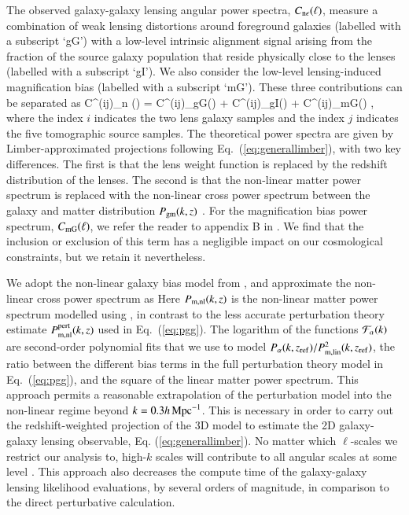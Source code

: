 The observed galaxy-galaxy lensing angular power spectra, $C_{\rm n \epsilon}(\ell)$, measure a combination of weak lensing distortions around foreground galaxies (labelled with a subscript `gG') with a low-level intrinsic alignment signal arising from the fraction of the source galaxy population that reside physically close to the lenses (labelled with a subscript `gI').   We also consider the low-level lensing-induced magnification bias (labelled with a subscript `mG').   These three contributions can be separated as 
\be
\label{eq:cl_ggl}
C^{(ij)}_{\rm n \epsilon}(\ell) = C^{(ij)}_{\rm gG}(\ell) +
C^{(ij)}_{\rm gI}(\ell) + C^{(ij)}_{\rm mG}(\ell)  \;,
\ee
where the index $i$ indicates the two lens galaxy samples and the index $j$ indicates the five tomographic source samples.   The theoretical power spectra are given by Limber-approximated projections following Eq.~(\ref{eq:generallimber}), with two key differences.   The first is that the lens weight function is replaced by the redshift distribution of the lenses.   The second is that the non-linear matter power spectrum is replaced with the non-linear cross power spectrum between the galaxy and matter distribution $P_{\rm gm}(k,z)$ \citep[see equations 28 and 29 of][for the full expressions]{joachimi/etal:inprep}.   For the magnification bias power spectrum, $C_{\rm mG}(\ell)$, we refer the reader to appendix B in \citet{joachimi/etal:inprep}.   We find that the inclusion or exclusion of this term has a negligible impact on our cosmological constraints, but we retain it nevertheless.

We adopt the non-linear galaxy bias model from \citet{sanchez/etal:2017}, and approximate the non-linear cross power spectrum as
Here $P_{\rm m, nl}(k,z)$ is the non-linear matter power spectrum modelled using \citet{mead/etal:2016}, in contrast to the less accurate perturbation theory estimate $P_{\rm m, nl}^{\rm pert}(k,z)$ used in Eq.~(\ref{eq:pgg}). 
The logarithm of the functions ${\cal F}_\alpha(k)$ are second-order polynomial fits that we use to model $P_\alpha(k,z_{\rm ref})/P^2_{\rm m, lin}(k,z_{\rm ref})$, the ratio between the different bias terms in the full perturbation theory model in Eq.~(\ref{eq:pgg}), and the square of the linear matter power spectrum.  This approach permits a reasonable extrapolation of the \citet{sanchez/etal:2017} perturbation model into the non-linear regime beyond $k = 0.3 h \,{\rm Mpc}^{-1}$.   This is necessary in order to carry out the redshift-weighted projection of the 3D model to estimate the 2D galaxy-galaxy lensing observable, Eq. (\ref{eq:generallimber}).  No matter which $\ell$-scales we restrict our analysis to, high-$k$ scales will contribute to all angular scales at some level \citep{joachimi/etal:inprep, asgari/etal:2020}.   This approach also decreases the compute time of the galaxy-galaxy lensing likelihood evaluations, by several orders of magnitude, in comparison to the direct perturbative calculation.  

